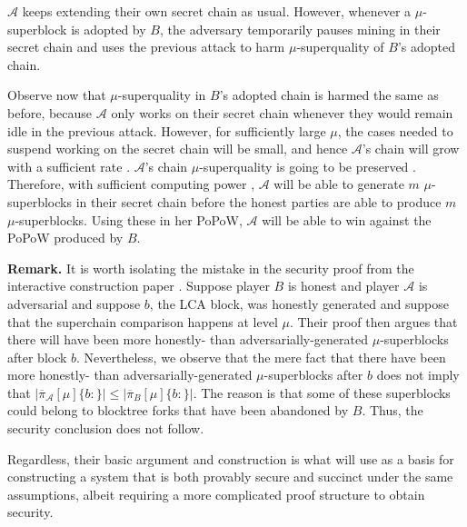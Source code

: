 $\mathcal{A}$ keeps extending their own secret chain as usual. However, whenever
a $\mu$-superblock is adopted by $B$, the adversary temporarily pauses mining in
their secret chain and uses the previous attack to harm $\mu$-superquality of
$B$'s adopted chain.

Observe now that $\mu$-superquality in $B$'s adopted chain is harmed the same as
before, because $\mathcal{A}$ only works on their secret chain whenever they
would remain idle in the previous attack. However, for sufficiently large $\mu$,
the cases needed to suspend working on the secret chain will be small, and hence
$\mathcal{A}$'s chain will grow with a sufficient rate . $\mathcal{A}$'s chain $\mu$-superquality is going to be preserved
. Therefore, with sufficient computing power
, $\mathcal{A}$ will be able to generate
$m$ $\mu$-superblocks in their secret chain before the honest parties are able
to produce $m$ $\mu$-superblocks. Using these in her PoPoW, $\mathcal{A}$ will
be able to win against the PoPoW produced by $B$.

\textbf{Remark.} It is worth isolating the mistake in the security proof from
the interactive construction paper \cite{KLS}. Suppose player $B$ is honest and
player $\mathcal{A}$ is adversarial and suppose $b$, the LCA block, was honestly
generated and suppose that the superchain comparison happens at level $\mu$.
Their proof then argues that there will have been more honestly- than
adversarially-generated $\mu$-superblocks after block $b$. Nevertheless, we
observe that the mere fact that there have been more honestly- than
adversarially-generated $\mu$-superblocks after $b$ does not imply that
$|\overline\pi_\mathcal{A}[\mu]\{b:\}| \leq |\overline\pi_B[\mu]\{b:\}|$. The
reason is that some of these superblocks could belong to blocktree forks that
have been abandoned by $B$. Thus, the security conclusion does not follow.

Regardless, their basic argument and construction is what will use as a basis
for constructing a system that is both provably secure and succinct under the
same assumptions, albeit requiring a more complicated proof structure to obtain
security.
